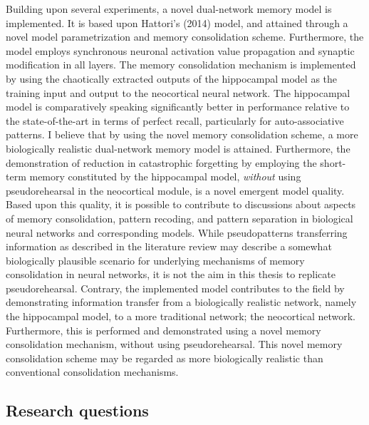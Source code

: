 Building upon several experiments, a novel dual-network memory model is implemented. It is based upon Hattori's (2014) model, and attained through a novel model parametrization and memory consolidation scheme. Furthermore, the model employs synchronous neuronal activation value propagation and synaptic modification in all layers. The memory consolidation mechanism is implemented by using the chaotically extracted outputs of the hippocampal model as the training input and output to the neocortical neural network. The hippocampal model is comparatively speaking significantly better in performance relative to the state-of-the-art in terms of perfect recall, particularly for auto-associative patterns. I believe that by using the novel memory consolidation scheme, a more biologically realistic dual-network memory model is attained. Furthermore, the demonstration of reduction in catastrophic forgetting by employing the short-term memory constituted by the hippocampal model, \textit{without} using pseudorehearsal in the neocortical module, is a novel emergent model quality. Based upon this quality, it is possible to contribute to discussions about aspects of memory consolidation, pattern recoding, and pattern separation in biological neural networks and corresponding models.
While pseudopatterns transferring information as described in the literature review may describe a somewhat biologically plausible scenario for underlying mechanisms of memory consolidation in neural networks, it is not the aim in this thesis to replicate pseudorehearsal. Contrary, the implemented model contributes to the field by demonstrating information transfer from a biologically realistic network, namely the hippocampal model, to a more traditional network; the neocortical network. Furthermore, this is performed and demonstrated using a novel memory consolidation mechanism, without using pseudorehearsal. This novel memory consolidation scheme may be regarded as more biologically realistic than conventional consolidation mechanisms.


\subsection*{Research questions}


